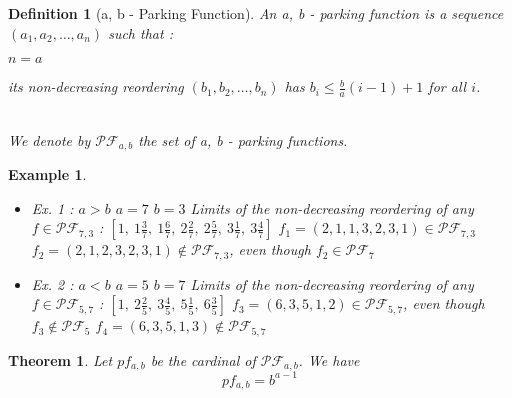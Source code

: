 \documentclass[12pt]{report}
\newtheorem{theorem}{Theorem}
\newtheorem{definition}{Definition}
\newtheorem*{example}{Example}
\begin{document}
\begin{definition}[a, b - Parking Function]
    An \emph{a, b - parking function} is a sequence 
    $(a_1, a_2, \ldots, a_n)$ such that :\\
    \begin{itemize*}
        \item $n = a$\\
        \item its non-decreasing reordering 
        $(b_1, b_2, \ldots, b_n)$
        has $b_i \leqslant \frac{b}{a}(i-1) + 1$
        for all $i$.\\\\
    \end{itemize*}
    We denote by $\mathcal{PF}_{a,b}$ the set of 
    a, b - parking functions.
\end{definition}

\begin{example}
    ~\\
    \begin{itemize}
        \item Ex. 1 : $a > b$
            \subitem $a = 7$
            \subitem $b = 3$
            \subitem Limits of the non-decreasing
            reordering of any $f \in \mathcal{PF}_{7,3}$ :
            \subitem $[1,\ 1 \frac{3}{7},\ 1 \frac{6}{7},\ 
            2 \frac{2}{7},\ 2 \frac{5}{7},\ 3 \frac{1}{7},\ 
            3 \frac{4}{7}]$
            \subitem $f_1 = (2, 1, 1, 3, 2, 3, 1) \in
            \mathcal{PF}_{7,3}$
            \subitem $f_2 = (2, 1, 2, 3, 2, 3, 1) \notin
            \mathcal{PF}_{7,3}$, even though $f_2 \in
            \mathcal{PF}_7$
        \item Ex. 2 : $a < b$
            \subitem $a = 5$
            \subitem $b = 7$
            \subitem Limits of the non-decreasing            
            reordering of any $f \in \mathcal{PF}_{5,7}$ :
            \subitem $[1,\ 2 \frac{2}{5},\ 3 \frac{4}{5},\ 
            5 \frac{1}{5},\ 6 \frac{3}{5}]$
            \subitem $f_3 = (6, 3, 5, 1, 2) \in
            \mathcal{PF}_{5,7}$, even though $f_3 \notin
            \mathcal{PF}_5$
            \subitem $f_4 = (6, 3, 5, 1, 3) \notin
            \mathcal{PF}_{5,7}$\\
    \end{itemize}
\end{example}

\begin{theorem}
    Let $pf_{a,b}$ be the cardinal of $\mathcal{PF}_{a,b}$.
    We have $$pf_{a,b} = b^{a-1}$$
\end{theorem}
\end{document}
